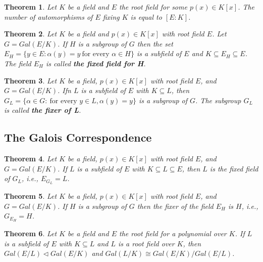 \documentclass[letterpaper, 12pt]{article}
\newtheorem{thm}{Theorem}
\begin{document}
			\setcounter{thm}{19}
			\begin{thm}
			Let $K$ be a field and $E$ the root field for some $p(x) \in K[x]$.
			The number of automorphisms of $E$ fixing $K$ is equal to $[E:K]$.
			\end{thm}

			\setcounter{thm}{22}
			\begin{thm}
			Let $K$ be a field and $p(x) \in K[x]$ with root field $E$.
			Let $G = Gal(E/K)$.
			If $H$ is a subgroup of $G$ then the set $E_{H} = \{ y \in E : \alpha(y) = y \ \text{for every } \alpha \in H \}$ is a subfield of $E$ and $K \subseteq E_{H} \subseteq E$.
			The field $E_{H}$ is called \textbf{the fixed field for H}.
			\end{thm}

			\begin{thm}
			Let $K$ be a field, $p(x) \in K[x]$ with root field $E$, and $G = Gal(E/K)$.
			Ifn $L$ is a subfield of $E$ with $K \subseteq L$, then $G_{L} = \{ \alpha \in G : \ \text{for every } y \in L, \alpha(y) = y \}$ is a subgroup of $G$.
			The subgroup $G_{L}$ is called \textbf{the fixer of L}.
			\end{thm}

		\subsection{The Galois Correspondence}
		\label{sec:the_galois_correspondence}
			\begin{thm}
			Let $K$ be a field, $p(x) \in K[x]$ with root field $E$, and $G = Gal(E/K)$.
			If $L$ is a subfield of $E$ with $K \subseteq L \subseteq E$, then $L$ is the fixed field of $G_{L}$, i.e., $E_{G_{L}} = L$.
			\end{thm}

			\setcounter{thm}{26}
			\begin{thm}
			Let $K$ be a field, $p(x) \in K[x]$ with root field $E$, and $G = Gal(E/K)$.
			If $H$ is a subgroup of $G$ then the fixer of the field $E_{H}$ is $H$, i.e., $G_{E_{H}} = H$.
			\end{thm}

			\setcounter{thm}{28}
			\begin{thm}
			Let $K$ be a field and $E$ the root field for a polynomial over $K$.
			If $L$ is a subfield of $E$ with $K \subseteq L$ and $L$ is a root field over $K$, then $Gal(E/L) \triangleleft Gal(E/K)$ and $Gal(L/K) \cong Gal(E/K) / Gal(E/L)$.
			\end{thm}
\end{document}
